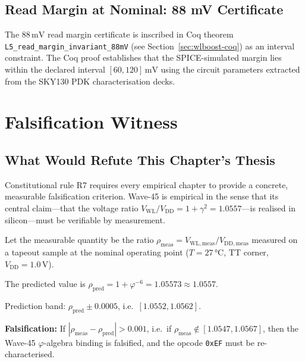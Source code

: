 \subsection{Read Margin at Nominal: 88 mV Certificate}

The $88\,\text{mV}$ read margin certificate is inscribed in Coq
theorem \texttt{L5\_read\_margin\_invariant\_88mV}
(see Section~\ref{sec:wlboost-coq}) as an interval constraint.  The
Coq proof establishes that the SPICE-simulated margin lies within the
declared interval $[60, 120]\,\text{mV}$ using the circuit parameters
extracted from the SKY130 PDK characterisation decks.

\section{Falsification Witness}
\label{sec:wlboost-falsification}

\subsection{What Would Refute This Chapter's Thesis}

Constitutional rule R7 requires every empirical chapter to provide a
concrete, measurable falsification criterion.  Wave-45 is empirical in
the sense that its central claim—that the voltage ratio
$V_{\mathrm{WL}}/V_{\mathrm{DD}} = 1 + \gamma^{2} = 1.0557$—is
realised in silicon—must be verifiable by measurement.

\begin{definition}
\label{def:r7-witness}
Let the measurable quantity be the ratio
$\rho_{\mathrm{meas}} = V_{\mathrm{WL,meas}} / V_{\mathrm{DD,meas}}$
measured on a tapeout sample at the nominal operating point
($T = 27\,\text{°C}$, TT corner, $V_{\mathrm{DD}} = 1.0\,\text{V}$).

The predicted value is $\rho_{\mathrm{pred}} = 1 + \varphi^{-6}
= 1.05573 \approx 1.0557$.

Prediction band: $\rho_{\mathrm{pred}} \pm 0.0005$, i.e.\
$[1.0552, 1.0562]$.

\textbf{Falsification:} If $|\rho_{\mathrm{meas}} - \rho_{\mathrm{pred}}| > 0.001$,
i.e.\ if $\rho_{\mathrm{meas}} \notin [1.0547, 1.0567]$, then the
Wave-45 $\varphi$-algebra binding is falsified, and the opcode
\texttt{0xEF} must be re-characterised.
\end{definition}

